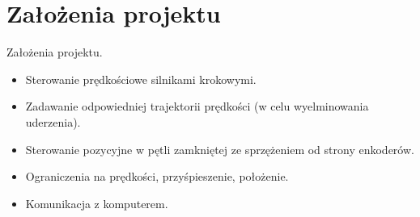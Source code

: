 \documentclass{beamer}
\begin{document}
\section{Założenia projektu}
\begin{frame}{Założenia projektu.}

	\begin{itemize}
		\item {
			Sterowanie prędkościowe silnikami krokowymi.
		}
		\item {
			Zadawanie odpowiedniej trajektorii prędkości (w celu wyelminowania uderzenia).
		}
		\item {
			Sterowanie pozycyjne w pętli zamkniętej ze sprzężeniem od strony enkoderów.
		}
		\item{
			Ograniczenia na prędkości, przyśpieszenie, położenie.
		}
		\item{
			Komunikacja z komputerem.
		}
	\end{itemize}
		\begin{figure}%
			\centering
			\qquad
			\qquad
			\label{fig:example2}%
		\end{figure}
\end{frame}
\end{document}
